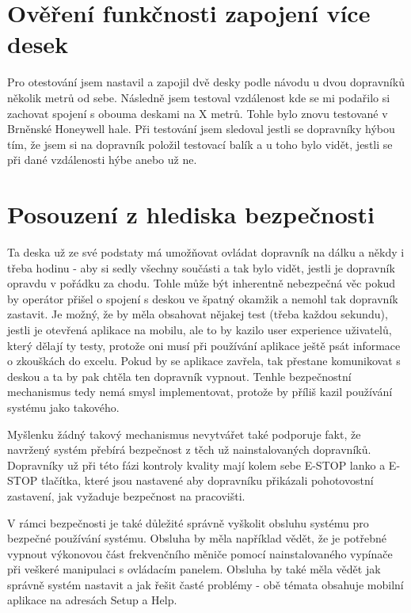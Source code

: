 \section{Ověření funkčnosti zapojení více desek}

Pro otestování jsem nastavil a zapojil dvě desky podle návodu u dvou dopravníků několik metrů od sebe. Následně jsem testoval vzdálenost kde se mi podařilo si zachovat spojení s obouma deskami na X metrů. Tohle bylo znovu testované v Brněnské Honeywell hale. Při testování jsem sledoval jestli se dopravníky hýbou tím, že jsem si na dopravník položil testovací balík a u toho bylo vidět, jestli se při dané vzdálenosti hýbe anebo už ne.

\section{Posouzení z hlediska bezpečnosti}\label{sec:PosouzeniZHlediskaBezpecnosti}

Ta deska už ze své podstaty má umožňovat ovládat dopravník na dálku a někdy i třeba hodinu - aby si sedly všechny součásti a tak bylo vidět, jestli je dopravník opravdu v pořádku za chodu. Tohle může být inherentně nebezpečná věc pokud by operátor přišel o spojení s deskou ve špatný okamžik a nemohl tak dopravník zastavit. Je možný, že by měla obsahovat nějakej test (třeba každou sekundu), jestli je otevřená aplikace na mobilu, ale to by kazilo user experience uživatelů, který dělají ty testy, protože oni musí při používání aplikace ještě psát informace o zkouškách do excelu. Pokud by se aplikace zavřela, tak přestane komunikovat s deskou a ta by pak chtěla ten dopravník vypnout. Tenhle bezpečnostní mechanismus tedy nemá smysl implementovat, protože by příliš kazil používání systému jako takového.

Myšlenku žádný takový mechanismus nevytvářet také podporuje fakt, že navržený systém přebírá bezpečnost z těch už nainstalovaných dopravníků. Dopravníky už při této fázi kontroly kvality mají kolem sebe E-STOP lanko a E-STOP tlačítka, které jsou nastavené aby dopravníku přikázali pohotovostní zastavení, jak vyžaduje bezpečnost na pracovišti.

V rámci bezpečnosti je také důležité správně vyškolit obsluhu systému pro bezpečné používání systému. Obsluha by měla například vědět, že je potřebné vypnout výkonovou část frekvenčního měniče pomocí nainstalovaného vypínače při veškeré manipulaci s ovládacím panelem. Obsluha by také měla vědět jak správně systém nastavit a jak řešit časté problémy - obě témata obsahuje mobilní aplikace na adresách Setup a Help.